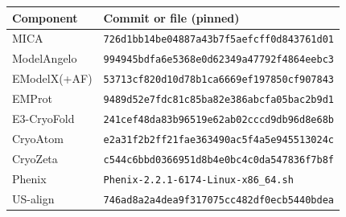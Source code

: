 \begin{tabular}{ll}
\toprule
Component & Commit or file (pinned) \\
\midrule
MICA & \texttt{726d1bb14be04887a43b7f5aefcff0d843761d01} \\
ModelAngelo & \texttt{994945bdfa6e5368e0d62349a47792f4864eebc3} \\
EModelX(+AF) & \texttt{53713cf820d10d78b1ca6669ef197850cf907843} \\
EMProt & \texttt{9489d52e7fdc81c85ba82e386abcfa05bac2b9d1} \\
E3-CryoFold & \texttt{241cef48da83b96519e62ab02cccd9db96d8e68b} \\
CryoAtom & \texttt{e2a31f2b2ff21fae363490ac5f4a5e945513024c} \\
CryoZeta & \texttt{c544c6bbd0366951d8b4e0bc4c0da547836f7b8f} \\
Phenix & \texttt{Phenix-2.2.1-6174-Linux-x86\_64.sh} \\
US-align & \texttt{746ad8a2a4dea9f317075cc482df0ecb5440bdea} \\
\bottomrule
\end{tabular}
